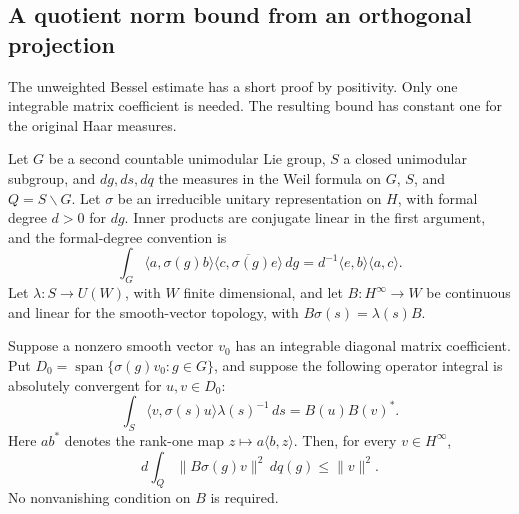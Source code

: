 \subsection{A quotient norm bound from an orthogonal projection}
\label{archimedean-quotient-mass}

The unweighted Bessel estimate has a short proof by positivity.  Only
one integrable matrix coefficient is needed.  The resulting bound has
constant one for the original Haar measures.

Let $G$ be a second countable unimodular Lie group, $S$ a closed
unimodular subgroup, and $dg,ds,dq$ the measures in the Weil formula
on $G$, $S$, and $Q=S\backslash G$.  Let $\sigma$ be an irreducible
unitary representation on $H$, with formal degree $d>0$ for $dg$.
Inner products are conjugate linear in the first argument, and the
formal-degree convention is
\[
 \int_G\langle a,\sigma(g)b\rangle
       \overline{\langle c,\sigma(g)e\rangle}\,dg
       =d^{-1}\langle e,b\rangle\langle a,c\rangle.
\]
Let $\lambda:S\to U(W)$, with $W$ finite dimensional, and let
$B:H^\infty\to W$ be continuous and linear for the smooth-vector
topology, with $B\sigma(s)=\lambda(s)B$.

\begin{theorem}\label{original-quotient-mass-bound}
Suppose a nonzero smooth vector $v_0$ has an integrable diagonal
matrix coefficient.  Put
$D_0=\operatorname{span}\{\sigma(g)v_0:g\in G\}$, and suppose the
following operator integral is absolutely convergent for $u,v\in D_0$:
\begin{equation}\label{quotient-mass-period}
 \int_S\langle v,\sigma(s)u\rangle\lambda(s)^{-1}\,ds
                  =B(u)B(v)^*.
\end{equation}
Here $a b^*$ denotes the rank-one map $z\mapsto a\langle b,z\rangle$.
Then, for every $v\in H^\infty$,
\begin{equation}\label{quotient-mass-result}
       d\int_Q\|B\sigma(g)v\|^2\,dq(g)\le\|v\|^2.
\end{equation}
No nonvanishing condition on $B$ is required.
\end{theorem}

